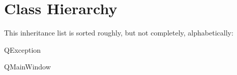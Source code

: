 \section{Class Hierarchy}
This inheritance list is sorted roughly, but not completely, alphabetically\-:\begin{DoxyCompactList}
\item {}
\item {}
\item {}
\item {}
\item Q\-Exception\begin{DoxyCompactList}
\item {}
\end{DoxyCompactList}
\item Q\-Main\-Window\begin{DoxyCompactList}
\item {}
\end{DoxyCompactList}
\end{DoxyCompactList}
